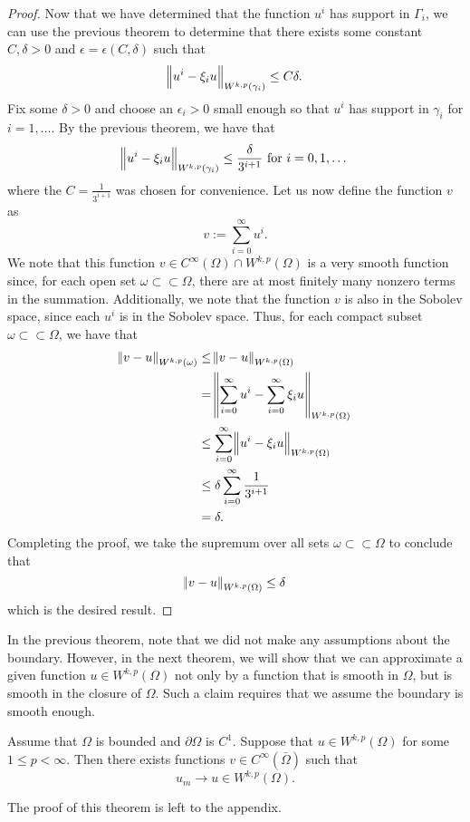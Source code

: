 \documentclass[10pt]{article}
\begin{document}
\begin{proof}
	Now that we have determined that the function $u^i$ has support in $\Gamma_i$, we can use the previous theorem to determine that there exists some constant $C, \delta > 0$ and $\epsilon = \epsilon(C,\delta)$ such that 
	\begin{equation*}
		\norm{u^i - \xi_i u}_{W^{k,p}(\gamma_i)} \leq C\delta. 
	\end{equation*}
	Fix some $\delta > 0$ and choose an $\epsilon_i > 0$ small enough so that $u^i$ has support in $\gamma_i$ for $i = 1,\dots$. By the previous theorem, we have that 
	\begin{equation*}
		\displaystyle \norm{u^i - \xi_i u}_{W^{k,p}(\gamma_i)} \leq \frac{\delta}{3^{i+1}} \textrm{ for } i = 0,1,\dots
	\end{equation*}
	where the $C = \frac{1}{3^{i+1}}$ was chosen for convenience. Let us now define the function $v$ as
	\begin{equation*}
		\displaystyle v := \sum\limits_{i = 0}^{\infty}{u^i}. 
	\end{equation*}
	We note that this function $v \in C^{\infty}(\Omega) \cap W^{k,p}(\Omega)$ is a very smooth function since, for each open set $\omega \subset \subset \Omega$, there are at most finitely many nonzero terms in the summation. Additionally, we note that the function $v$ is also in the Sobolev space, since each $u^i$ is in the Sobolev space. Thus, for each compact subset $\omega \subset \subset \Omega$, we have that 
	\begin{align*}
		\displaystyle \norm{v - u}_{W^{k,p}(\omega)} &\leq \norm{v - u}_{W^{k,p}(\Omega)} \\
		&= \norm{\sum\limits_{i=0}^{\infty}{u^i} - \sum\limits_{i = 0}^{\infty}{\xi_i u}}_{W^{k,p}(\Omega)} \\
		&\leq \sum\limits_{i = 0}^{\infty}{\norm{u^i - \xi_i u}_{W^{k,p}(\Omega)}} \\
		&\leq \delta\sum\limits_{i=0}^{\infty}{\frac{1}{3^{i+1}}} \\
		&= \delta.
	\end{align*}
	Completing the proof, we take the supremum over all sets $\omega \subset \subset \Omega$ to conclude that 
	\begin{equation*}
		\displaystyle \norm{v-u}_{W^{k,p}(\Omega)} \leq \delta
	\end{equation*} 
	which is the desired result. 
\end{proof}
In the previous theorem, note that we did not make any assumptions about the boundary. However, in the next theorem, we will show that we can approximate a given function $u \in W^{k,p}(\Omega)$ not only by a function that is smooth in $\Omega$, but is smooth in the closure of $\Omega$. Such a claim requires that we assume the boundary is smooth enough. 
\begin{theorem}
	Assume that $\Omega$ is bounded and $\partial \Omega$ is $C^1$. Suppose that $u \in W^{k,p}(\Omega)$ for some $1 \leq p < \infty$. Then there exists functions $v \in C^{\infty}(\bar{\Omega})$ such that 
	\begin{equation*}
		\displaystyle u_m \to u \in W^{k,p}(\Omega).
	\end{equation*}
\end{theorem}
The proof of this theorem is left to the appendix. 
\end{document}
